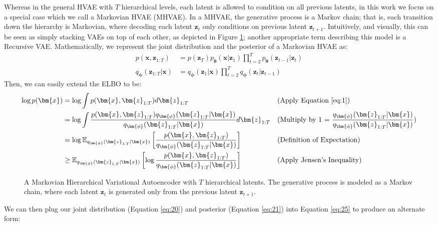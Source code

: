 Whereas in the general HVAE with $T$ hierarchical levels, each latent is allowed to condition on all previous latents, in this work we focus on a special case which we call a Markovian HVAE (MHVAE).  In a MHVAE, the generative process is a Markov chain; that is, each transition down the hierarchy is Markovian, where decoding each latent $\bm{z}_t$ only conditions on previous latent $\bm{z}_{t+1}$.  Intuitively, and visually, this can be seen as simply stacking VAEs on top of each other, as depicted in Figure \ref{fig:hvae}; another appropriate term describing this model is a Recursive VAE.  Mathematically, we represent the joint distribution and the posterior of a Markovian HVAE as:
\begin{align}
    p(\bm{x}, \bm{z}_{1:T}) &= p(\bm{z}_T)p_{\bm{\theta}}(\bm{x}|\bm{z}_1)\prod_{t=2}^{T}p_{\bm{\theta}}(\bm{z}_{t-1}|\bm{z}_{t}) \label{eq:20}\\
    q_{\bm{\phi}}(\bm{z}_{1:T}|\bm{x}) &= q_{\bm{\phi}}(\bm{z}_1|\bm{x})\prod_{t=2}^{T}q_{\bm{\phi}}(\bm{z}_{t}|\bm{z}_{t-1}) \label{eq:21}
\end{align}
Then, we can easily extend the ELBO to be:
\begin{align}
\log p(\bm{x}) &= \log \int p(\bm{x}, \bm{z}_{1:T}) d\bm{z}_{1:T}         && \text{(Apply Equation \ref{eq:1})}\\
&= \log \int \frac{p(\bm{x}, \bm{z}_{1:T})q_{\bm{\phi}}(\bm{z}_{1:T}|\bm{x})}{q_{\bm{\phi}}(\bm{z}_{1:T}|\bm{x})} d\bm{z}_{1:T}         && \text{(Multiply by 1 = $\frac{q_{\bm{\phi}}(\bm{z}_{1:T}|\bm{x})}{q_{\bm{\phi}}(\bm{z}_{1:T}|\bm{x})}$)}\\
&= \log \mathbb{E}_{q_{\bm{\phi}}(\bm{z}_{1:T}|\bm{x})}\left[\frac{p(\bm{x}, \bm{z}_{1:T})}{q_{\bm{\phi}}(\bm{z}_{1:T}|\bm{x})}\right]         && \text{(Definition of Expectation)}\\
&\geq \mathbb{E}_{q_{\bm{\phi}}(\bm{z}_{1:T}|\bm{x})}\left[\log \frac{p(\bm{x}, \bm{z}_{1:T})}{q_{\bm{\phi}}(\bm{z}_{1:T}|\bm{x})}\right]         && \text{(Apply Jensen's Inequality)} \label{eq:25}
\end{align}
\begin{figure}
  \centering
  \caption{A Markovian Hierarchical Variational Autoencoder with $T$ hierarchical latents.  The generative process is modeled as a Markov chain, where each latent $\bm{z}_t$ is generated only from the previous latent $\bm{z}_{t+1}$.}
  \label{fig:hvae}
\end{figure}We can then plug our joint distribution (Equation \ref{eq:20}) and posterior (Equation \ref{eq:21}) into Equation \ref{eq:25} to produce an alternate form:
